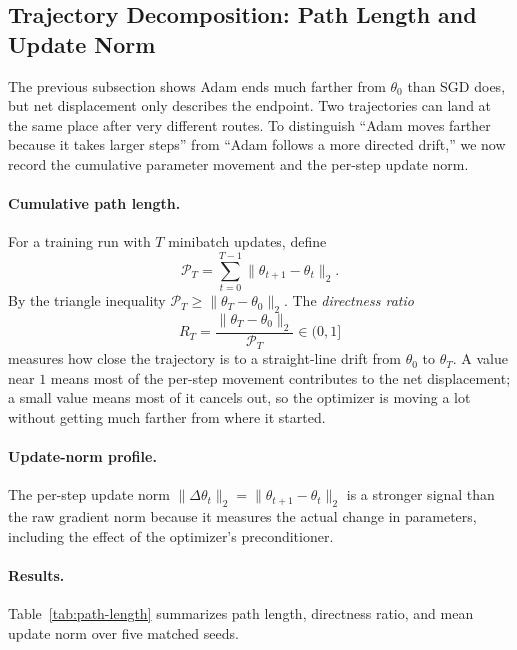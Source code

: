 \documentclass[11pt]{article}
\begin{document}
\subsection{Trajectory Decomposition: Path Length and Update Norm}
\label{sec:path-length}

The previous subsection shows Adam ends much farther from $\theta_0$ than SGD does, but net displacement only describes the endpoint. Two trajectories can land at the same place after very different routes. To distinguish ``Adam moves farther because it takes larger steps'' from ``Adam follows a more directed drift,'' we now record the cumulative parameter movement and the per-step update norm.

\paragraph{Cumulative path length.} For a training run with $T$ minibatch updates, define
\[
  \mathcal{P}_T = \sum_{t=0}^{T-1}\|\theta_{t+1}-\theta_t\|_2.
\]
By the triangle inequality $\mathcal{P}_T \ge \|\theta_T-\theta_0\|_2$. The \emph{directness ratio}
\[
  R_T = \frac{\|\theta_T-\theta_0\|_2}{\mathcal{P}_T}\in (0,1]
\]
measures how close the trajectory is to a straight-line drift from $\theta_0$ to $\theta_T$. A value near $1$ means most of the per-step movement contributes to the net displacement; a small value means most of it cancels out, so the optimizer is moving a lot without getting much farther from where it started.

\paragraph{Update-norm profile.} The per-step update norm $\|\Delta\theta_t\|_2 = \|\theta_{t+1}-\theta_t\|_2$ is a stronger signal than the raw gradient norm because it measures the actual change in parameters, including the effect of the optimizer's preconditioner.

\paragraph{Results.} Table~\ref{tab:path-length} summarizes path length, directness ratio, and mean update norm over five matched seeds.
\end{document}
